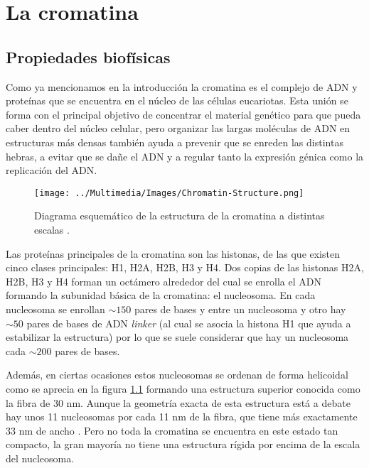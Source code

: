 \chapter{La cromatina}
\label{cap:chromatin}

\section{Propiedades biofísicas}

Como ya mencionamos en la introducción la cromatina es el complejo de ADN y proteínas que se encuentra en el núcleo de las células eucariotas. Esta unión se forma con el principal objetivo de concentrar el material genético para que pueda caber dentro del núcleo celular, pero organizar las largas moléculas de ADN en estructuras más densas también ayuda a prevenir que se enreden las distintas hebras, a evitar que se dañe el ADN y a regular tanto la expresión génica como la replicación del ADN.

\begin{figure}[t]
    \centering
    \texttt{[image: ../Multimedia/Images/Chromatin-Structure.png]}
    \caption{Diagrama esquemático de la estructura de la cromatina a distintas escalas \cite{Felsenfeld2003}.}
    \label{fig:chromatin-structure}
\end{figure}

Las proteínas principales de la cromatina son las histonas, de las que existen cinco clases principales: H1, H2A, H2B, H3 y H4. Dos copias de las histonas H2A, H2B, H3 y H4 forman un octámero alrededor del cual se enrolla el ADN formando la subunidad básica de la cromatina: el nucleosoma. En cada nucleosoma se enrollan $\sim150$ pares de bases y entre un nucleosoma y otro hay $\sim50$ pares de bases de ADN \textit{linker} (al cual se asocia la histona H1 que ayuda a estabilizar la estructura) por lo que se suele considerar que hay un nucleosoma cada $\sim200$ pares de bases.

Además, en ciertas ocasiones estos nucleosomas se ordenan de forma helicoidal como se aprecia en la figura \ref{fig:chromatin-structure} formando una estructura superior conocida como la fibra de 30 nm. Aunque la geometría exacta de esta estructura está a debate hay unos 11 nucleosomas por cada 11 nm de la fibra, que tiene más exactamente 33 nm de ancho \cite{Robinson2006}. Pero no toda la cromatina se encuentra en este estado tan compacto, la gran mayoría no tiene una estructura rígida por encima de la escala del nucleosoma.

